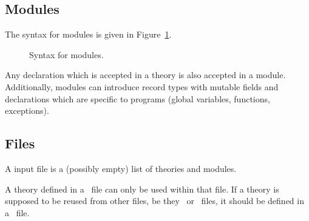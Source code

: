 \subsection{Modules}

The syntax for modules is given in Figure~\ref{fig:bnf:module}.
\begin{figure}
  \begin{center}\framebox{}\end{center}
  \caption{Syntax for modules.}
\label{fig:bnf:module}
\end{figure}
Any declaration which is accepted in a theory is also accepted in a
module. Additionally, modules can introduce record types with mutable
fields and declarations which are specific to programs (global
variables, functions, exceptions).

\subsection{Files}

A \whyml input file is a (possibly empty) list of theories and modules.
\begin{center}\framebox{}\end{center}
A theory defined in a \whyml\ file can only be used within that
file. If a theory is supposed to be reused from other files, be they
\why\ or \whyml\ files, it should be defined in a \why\ file.

